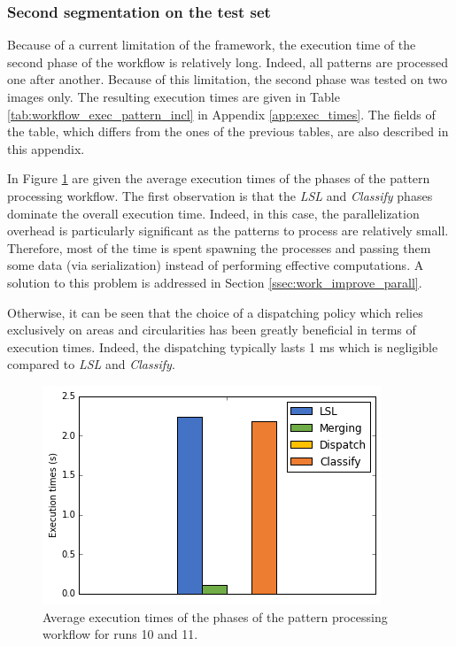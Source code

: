 \subsubsection{Second segmentation on the test set}
\label{sssec:perf_third_test}

Because of a current limitation of the framework, the execution time of the second phase of the workflow is relatively long. Indeed, all patterns are processed one after another. Because of this limitation, the second phase was tested on two images only. The resulting execution times are given in Table \ref{tab:workflow_exec_pattern_incl} in Appendix \ref{app:exec_times}. The fields of the table, which differs from the ones of the previous tables, are also described in this appendix.

In Figure \ref{fig:perf_pattern_processing} are given the average execution times of the phases of the pattern processing workflow. The first observation is that the \textit{LSL} and \textit{Classify} phases dominate the overall execution time. Indeed, in this case, the parallelization overhead is particularly significant as the patterns to process are relatively small. Therefore, most of the time is spent spawning the processes and passing them some data (via serialization) instead of performing effective computations. A solution to this problem is addressed in Section \ref{ssec:work_improve_parall}. 

Otherwise, it can be seen that the choice of a dispatching policy which relies exclusively on areas and circularities has been greatly beneficial in terms of execution times. Indeed, the dispatching typically lasts 1 ms which is negligible compared to \textit{LSL} and \textit{Classify}.

\begin{figure}
	\center
	\includegraphics[scale=0.5]{image/perf_pattern_process.png}
	\caption{Average execution times of the phases of the pattern processing workflow for runs 10 and 11.}
	\label{fig:perf_pattern_processing}
\end{figure}

